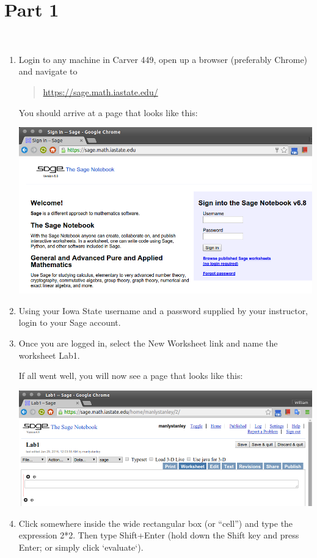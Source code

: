 \documentclass[fleqn,11pt]{paper}
\theoremstyle{remark}
\newcommand{\<}{\ensuremath{\langle}}
\renewcommand{\>}{\ensuremath{\rangle}}
\begin{document}
\section*{Part 1}
~
  \begin{enumerate}
  \item Login to any machine in Carver 449, open up a browser (preferably Chrome) and navigate to

    \begin{quote}
      \url{https://sage.math.iastate.edu/}
    \end{quote}


\newpage
    You should arrive at a page that looks like this:

    \includegraphics[scale=.4]{Sage-login.png}

  \item Using your Iowa State username and a password supplied by your instructor, login to your
    Sage account.  \\

  \item Once you are logged in, select the New Worksheet link and name the worksheet Lab1.  

    If all went well, you will now see a page that looks like this:

    \includegraphics[scale=.4]{Lab1-screen.png}
\\
  \item Click somewhere inside the wide rectangular box (or ``cell'') and type the expression 2*2.
    Then type Shift+Enter (hold down the Shift key and press Enter; or simply click `evaluate`).


\end{enumerate}
\end{document}
